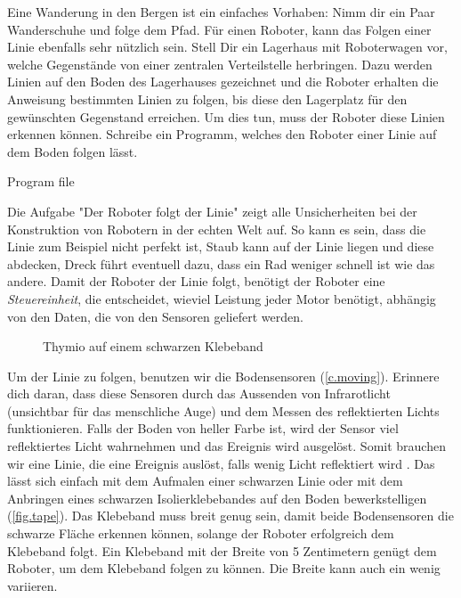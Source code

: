 \label{ch.line}

Eine Wanderung in den Bergen ist ein einfaches Vorhaben: Nimm dir ein Paar Wanderschuhe und folge dem Pfad. Für einen Roboter, kann das Folgen einer Linie ebenfalls sehr nützlich sein.
Stell Dir ein Lagerhaus mit Roboterwagen vor,
welche Gegenstände von einer zentralen Verteilstelle herbringen.
Dazu werden Linien auf den Boden des Lagerhauses gezeichnet
und die Roboter erhalten die Anweisung bestimmten Linien zu folgen,
bis diese den Lagerplatz für den gewünschten Gegenstand erreichen.
Um dies tun, muss der Roboter diese Linien erkennen können.
Schreibe ein Programm, welches den Roboter einer Linie auf dem Boden folgen lässt.

{\raggedleft \hfill Program file }

Die Aufgabe "Der Roboter folgt der Linie"  zeigt
alle Unsicherheiten bei der Konstruktion von Robotern in der echten Welt auf.
So kann es sein, dass die Linie zum Beispiel nicht perfekt ist,
Staub kann auf der Linie liegen und diese abdecken,
Dreck führt eventuell dazu, dass ein Rad weniger schnell ist wie das andere.
Damit der Roboter der Linie folgt, benötigt der Roboter eine
\emph{Steuereinheit}, die entscheidet, wieviel Leistung jeder Motor benötigt,
abhängig von den Daten, die von den Sensoren geliefert werden.


\begin{figure}
	\hfill
	\caption{Thymio auf einem schwarzen Klebeband}
\end{figure}
Um der Linie zu folgen, benutzen wir die Bodensensoren (\cref{c.moving}). Erinnere dich daran, dass diese Sensoren durch das Aussenden von Infrarotlicht (unsichtbar für das menschliche Auge) und dem Messen des reflektierten Lichts funktionieren. Falls der Boden von heller Farbe ist,
wird der Sensor viel reflektiertes Licht wahrnehmen und das Ereignis   wird ausgelöst.
Somit brauchen wir eine Linie, die eine Ereignis auslöst, 
falls wenig Licht reflektiert wird .
Das lässt sich einfach mit dem Aufmalen einer schwarzen Linie oder mit dem Anbringen eines schwarzen
Isolierklebebandes auf den Boden bewerkstelligen (\cref{fig.tape}).
Das Klebeband muss breit genug sein,
damit beide Bodensensoren die schwarze Fläche erkennen können,
solange der Roboter erfolgreich dem Klebeband folgt.
Ein Klebeband mit der Breite von 5 Zentimetern genügt dem Roboter,
um dem Klebeband folgen zu können. Die Breite kann auch ein wenig variieren.

